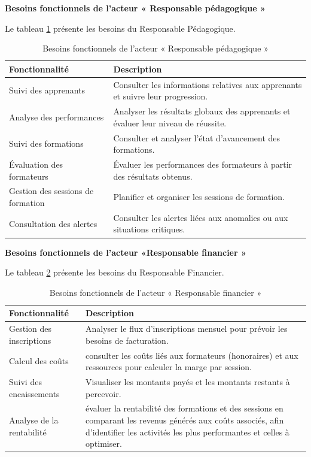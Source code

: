 \noindent\textbf{Besoins fonctionnels de l’acteur « Responsable pédagogique »}

\noindent Le tableau \ref{tab:Besoins fonctionnels de l’acteur « Responsable pédagogique »} présente les besoins du Responsable Pédagogique.

\begin{table}[H]
\centering
\caption{Besoins fonctionnels de l’acteur « Responsable pédagogique »}
\label{tab:Besoins fonctionnels de l’acteur « Responsable pédagogique »}
\begin{tabular}{|p{4.5cm}| p{11cm}|}
\hline
\textbf{Fonctionnalité} & \textbf{Description} \\
\hline
Suivi des apprenants &
Consulter les informations relatives aux apprenants et suivre leur progression. \\
\hline
Analyse des performances &
Analyser les résultats globaux des apprenants et évaluer leur niveau de réussite. \\
\hline
Suivi des formations &
Consulter et analyser l’état d’avancement des formations. \\
\hline
Évaluation des formateurs &
Évaluer les performances des formateurs à partir des résultats obtenus. \\
\hline
Gestion des sessions de formation &
Planifier et organiser les sessions de formation. \\
\hline
Consultation des alertes &
Consulter les alertes liées aux anomalies ou aux situations critiques. \\
\hline
\end{tabular}
\end{table}

\noindent\textbf{Besoins fonctionnels de l’acteur «Responsable financier »}

\noindent Le tableau \ref{tab:Besoins fonctionnels de l’acteur « Responsable financier »} présente les besoins du Responsable Financier.
\begin{table}[H]
\centering
\caption{Besoins fonctionnels de l’acteur « Responsable financier »}
\label{tab:Besoins fonctionnels de l’acteur « Responsable financier »}
\begin{tabular}{|p{4.5cm}| p{11cm}|}
\hline
\textbf{Fonctionnalité} & \textbf{Description} \\
\hline
Gestion des inscriptions & Analyser le flux d'inscriptions mensuel pour prévoir les besoins de facturation. \\
\hline
Calcul des coûts & consulter les coûts liés aux formateurs (honoraires) et aux ressources pour calculer la marge par session.\\
\hline
Suivi des encaissements & Visualiser les montants payés et les montants restants à percevoir.\\
\hline
Analyse de la rentabilité  &  évaluer la rentabilité des formations et des sessions en comparant les revenus générés aux coûts associés, afin d’identifier les activités les plus performantes et celles à optimiser. \\
\hline
\end{tabular}
\end{table}



